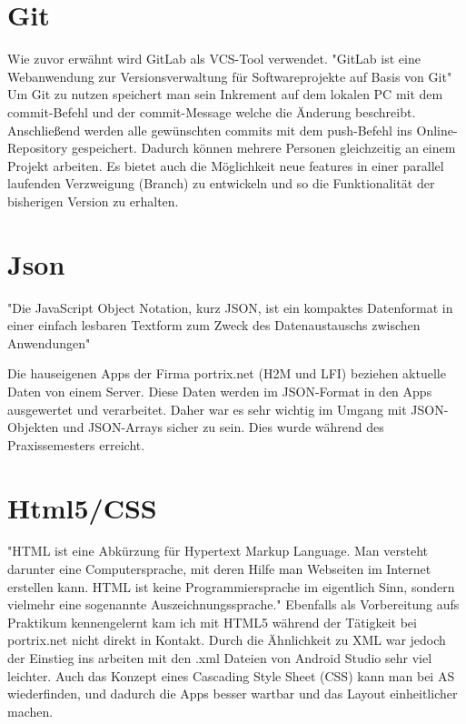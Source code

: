 \section{Git}
Wie zuvor erw\"ahnt wird GitLab als VCS-Tool verwendet. "GitLab ist eine Webanwendung zur Versionsverwaltung f\"ur Softwareprojekte auf Basis von Git"\footnotemark {} 
Um Git zu nutzen speichert man sein Inkrement auf dem lokalen PC mit dem commit-Befehl und der commit-Message welche die \"Anderung beschreibt. Anschlie\ss{}end werden alle gew\"unschten commits mit dem push-Befehl ins Online-Repository gespeichert. Dadurch k\"onnen mehrere Personen gleichzeitig an einem Projekt arbeiten. Es bietet auch die M\"oglichkeit neue features in einer parallel laufenden Verzweigung (Branch) zu entwickeln und so die Funktionalit\"at der bisherigen Version zu erhalten. 


\section{Json}
"Die JavaScript Object Notation, kurz JSON, ist ein kompaktes Datenformat in einer einfach lesbaren Textform zum Zweck des Datenaustauschs zwischen Anwendungen"\footnotemark 

Die hauseigenen Apps der Firma portrix.net (H2M und LFI) beziehen aktuelle Daten von einem Server. Diese Daten werden im JSON-Format in den Apps ausgewertet und verarbeitet. Daher war es sehr wichtig im Umgang mit JSON-Objekten und JSON-Arrays sicher zu sein. Dies wurde w\"ahrend des Praxissemesters erreicht.

\section{Html5/CSS}
"HTML ist eine Abk\"urzung f\"ur Hypertext Markup Language. Man versteht darunter eine Computersprache, mit deren Hilfe man Webseiten im Internet erstellen kann. HTML ist keine Programmiersprache im eigentlich Sinn, sondern vielmehr eine sogenannte Auszeichnungssprache."\footnotemark 
{} 
Ebenfalls als Vorbereitung aufs Praktikum kennengelernt kam ich mit HTML5 w\"ahrend der T\"atigkeit bei portrix.net nicht direkt in Kontakt. Durch die \"Ahnlichkeit zu XML war jedoch der Einstieg ins arbeiten mit den .xml Dateien von Android Studio sehr viel leichter. Auch das Konzept eines Cascading Style Sheet (CSS) kann man bei AS wiederfinden, und dadurch die Apps besser wartbar und das Layout einheitlicher machen.



